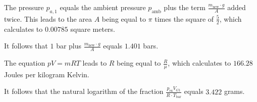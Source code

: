 The pressure \( p_{a,1} \) equals the ambient pressure \( p_{\text{amb}} \) plus the term \( \frac{m_{\text{new}} \cdot g}{A} \) added twice. This leads to the area \( A \) being equal to \( \pi \) times the square of \( \frac{5}{2} \), which calculates to \( 0.00785 \) square meters.

It follows that \( 1 \) bar plus \( \frac{m_{\text{new}} \cdot g}{A} \) equals \( 1.401 \) bars.

The equation \( pV = mRT \) leads to \( R \) being equal to \( \frac{R}{\mu} \), which calculates to \( 166.28 \) Joules per kilogram Kelvin.

It follows that the natural logarithm of the fraction \( \frac{p_{\text{ex}} V_{G1}}{R \cdot T_{\text{bar}}} \) equals \( 3.422 \) grams.